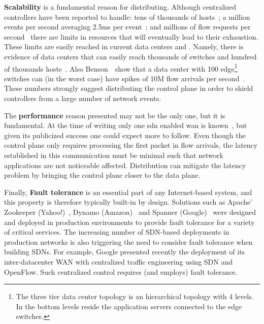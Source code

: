 \textbf{Scalability} is a fundamental reason for distributing. 
Although centralized controllers have been reported to handle: tens of thousands of hosts~\cite{Casado:2007kb}; a million events per second averaging 2.5ms per event~\cite{Tootoonchian:2012uia}; and millions of flow requests per second~\cite{Erickson:2013er} there are limits in resources that will eventually lead to their exhaustion. 
These limits are easily reached in current data centers and . 
Namely, there is evidence of data centers that can  easily reach thousands of switches and hundred of thousands hosts~\cite{Scott:2012tt}. 
Also Benson~\etal\ show that a data center with 100 edge\footnote{The three tier data center topology is an hierarchical topology with 4 levels. In the bottom levels reside the application servers connected to the edge switches.} switches can (in the worst case) have spikes of 10M  flow arrivals per second~\cite{benson2010network}. 
These numbers strongly  suggest distributing the control plane in order to shield controllers from a large number of network events. 

The \textbf{performance} reason presented may not be the only one, but it is fundamental. 
At the time of writing only one \gls{sdn} enabled \gls{wan} is known~\cite{jain2013b4}, but given its publicized success one could expect more to follow. 
Even though the control plane only requires processing the first packet in flow arrivals, the latency established in this communication must be minimal such that network applications are not noticeable affected. 
Distribution can mitigate the latency problem by bringing the control plane closer to the data plane. 

Finally,  \textbf{Fault tolerance} is an essential part of any Internet-based system, and this property is therefore typically built-in by design. 
Solutions such as Apache' Zookeeper (Yahoo!)~\cite{Hunt:2010ux}, Dynamo (Amazon)~\cite{DeCandia:2007cn} and Spanner (Google)~\cite{Corbett:2012uz} were designed and deployed in production environments to provide fault tolerance for a variety of critical services.
The increasing number of SDN-based deployments in production networks is also triggering the need to consider fault tolerance when building SDNs.
For example, Google presented recently the deployment of its inter-datacenter WAN with centralized traffic engineering using SDN and OpenFlow.
Such centralized control requires (and employs) fault tolerance.

